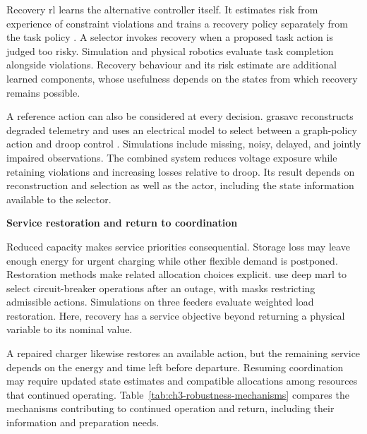 Recovery \gls{rl} learns the alternative controller itself. It estimates risk from experience of constraint violations and trains a recovery policy separately from the task policy \parencite{thananjeyan2021recovery}. A selector invokes recovery when a proposed task action is judged too risky. Simulation and physical robotics evaluate task completion alongside violations. Recovery behaviour and its risk estimate are additional learned components, whose usefulness depends on the states from which recovery remains possible.

A reference action can also be considered at every decision. \gls{grasavc} reconstructs degraded telemetry and uses an electrical model to select between a graph-policy action and droop control \parencite{jin2026gras}. Simulations include missing, noisy, delayed, and jointly impaired observations. The combined system reduces voltage exposure while retaining violations and increasing losses relative to droop. Its result depends on reconstruction and selection as well as the actor, including the state information available to the selector.

\smallskip
\noindent\textbf{Service restoration and return to coordination}\par\nobreak\smallskip
Reduced capacity makes service priorities consequential. Storage loss may leave enough energy for urgent charging while other flexible demand is postponed. Restoration methods make related allocation choices explicit. \textcite{vu2024restoration} use deep \gls{marl} to select circuit-breaker operations after an outage, with masks restricting admissible actions. Simulations on three feeders evaluate weighted load restoration. Here, recovery has a service objective beyond returning a physical variable to its nominal value.

A repaired charger likewise restores an available action, but the remaining service depends on the energy and time left before departure. Resuming coordination may require updated state estimates and compatible allocations among resources that continued operating. Table~\ref{tab:ch3-robustness-mechanisms} compares the mechanisms contributing to continued operation and return, including their information and preparation needs.

